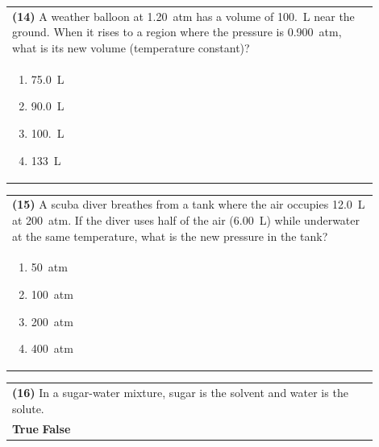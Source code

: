 \documentclass{article}
\begin{document}
\vspace{0.2cm}
\noindent\begin{tabular}{|p{0.9\linewidth}|}
\hline
\textbf{(14)} A weather balloon at 1.20~atm has a volume of 100.~L near the ground. When it rises to a region where the pressure is 0.900~atm, what is its new volume (temperature constant)?\\[0.2cm]
\begin{minipage}[t]{0.85\linewidth}
\begin{enumerate}[label=\alph*.]
\item 75.0~L
\item 90.0~L
\item 100.~L
\item 133~L
\end{enumerate}
\end{minipage}\\[0.2cm]
\hline
\end{tabular}

\vspace{0.2cm}
\noindent\begin{tabular}{|p{0.9\linewidth}|}
\hline
\textbf{(15)} A scuba diver breathes from a tank where the air occupies 12.0~L at 200~atm. If the diver uses half of the air (6.00~L) while underwater at the same temperature, what is the new pressure in the tank?\\[0.2cm]
\begin{minipage}[t]{0.85\linewidth}
\begin{enumerate}[label=\alph*.]
\item 50~atm
\item 100~atm
\item 200~atm
\item 400~atm
\end{enumerate}
\end{minipage}\\[0.2cm]
\hline
\end{tabular}

\vspace{0.2cm}
\noindent\begin{tabular}{|p{0.9\linewidth}|}
\hline
\textbf{(16)} In a sugar-water mixture, sugar is the solvent and water is the solute.\\[0.2cm]
\textbf{True} \hspace{1cm} \textbf{False}\\[0.2cm]
\hline
\end{tabular}
\newpage
\end{document}
